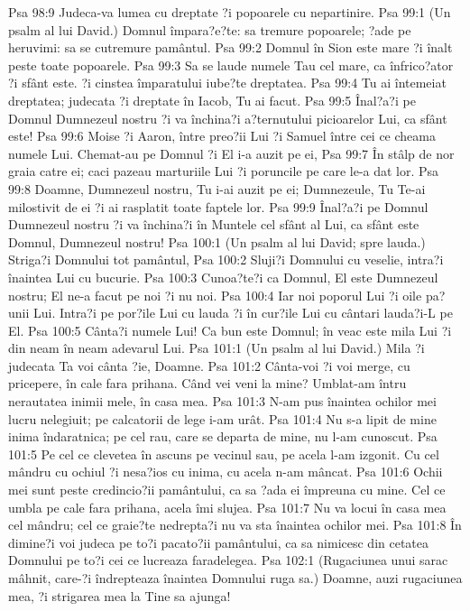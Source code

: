 Psa 98:9  Judeca-va lumea cu dreptate ?i popoarele cu nepartinire.
Psa 99:1  (Un psalm al lui David.) Domnul împara?e?te: sa tremure popoarele; ?ade pe heruvimi: sa se cutremure pamântul.
Psa 99:2  Domnul în Sion este mare ?i înalt peste toate popoarele.
Psa 99:3  Sa se laude numele Tau cel mare, ca înfrico?ator ?i sfânt este. ?i cinstea împaratului iube?te dreptatea.
Psa 99:4  Tu ai întemeiat dreptatea; judecata ?i dreptate în Iacob, Tu ai facut.
Psa 99:5  Înal?a?i pe Domnul Dumnezeul nostru ?i va închina?i a?ternutului picioarelor Lui, ca sfânt este!
Psa 99:6  Moise ?i Aaron, între preo?ii Lui ?i Samuel între cei ce cheama numele Lui. Chemat-au pe Domnul ?i El i-a auzit pe ei,
Psa 99:7  În stâlp de nor graia catre ei; caci pazeau marturiile Lui ?i poruncile pe care le-a dat lor.
Psa 99:8  Doamne, Dumnezeul nostru, Tu i-ai auzit pe ei; Dumnezeule, Tu Te-ai milostivit de ei ?i ai rasplatit toate faptele lor.
Psa 99:9  Înal?a?i pe Domnul Dumnezeul nostru ?i va închina?i în Muntele cel sfânt al Lui, ca sfânt este Domnul, Dumnezeul nostru!
Psa 100:1  (Un psalm al lui David; spre lauda.) Striga?i Domnului tot pamântul,
Psa 100:2  Sluji?i Domnului cu veselie, intra?i înaintea Lui cu bucurie.
Psa 100:3  Cunoa?te?i ca Domnul, El este Dumnezeul nostru; El ne-a facut pe noi ?i nu noi.
Psa 100:4  Iar noi poporul Lui ?i oile pa?unii Lui. Intra?i pe por?ile Lui cu lauda ?i în cur?ile Lui cu cântari lauda?i-L pe El.
Psa 100:5  Cânta?i numele Lui! Ca bun este Domnul; în veac este mila Lui ?i din neam în neam adevarul Lui.
Psa 101:1  (Un psalm al lui David.) Mila ?i judecata Ta voi cânta ?ie, Doamne.
Psa 101:2  Cânta-voi ?i voi merge, cu pricepere, în cale fara prihana. Când vei veni la mine? Umblat-am întru nerautatea inimii mele, în casa mea.
Psa 101:3  N-am pus înaintea ochilor mei lucru nelegiuit; pe calcatorii de lege i-am urât.
Psa 101:4  Nu s-a lipit de mine inima îndaratnica; pe cel rau, care se departa de mine, nu l-am cunoscut.
Psa 101:5  Pe cel ce clevetea în ascuns pe vecinul sau, pe acela l-am izgonit. Cu cel mândru cu ochiul ?i nesa?ios cu inima, cu acela n-am mâncat.
Psa 101:6  Ochii mei sunt peste credincio?ii pamântului, ca sa ?ada ei împreuna cu mine. Cel ce umbla pe cale fara prihana, acela îmi slujea.
Psa 101:7  Nu va locui în casa mea cel mândru; cel ce graie?te nedrepta?i nu va sta înaintea ochilor mei.
Psa 101:8  În dimine?i voi judeca pe to?i pacato?ii pamântului, ca sa nimicesc din cetatea Domnului pe to?i cei ce lucreaza faradelegea.
Psa 102:1  (Rugaciunea unui sarac mâhnit, care-?i îndrepteaza înaintea Domnului ruga sa.) Doamne, auzi rugaciunea mea, ?i strigarea mea la Tine sa ajunga!
